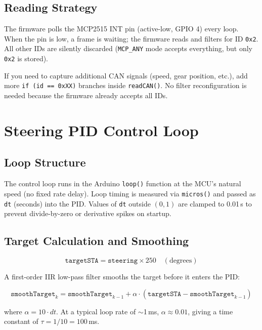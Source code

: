 \documentclass[12pt, letterpaper]{article}
\begin{document}
\subsection{Reading Strategy}

The firmware polls the MCP2515 INT pin (active-low, GPIO 4) every loop.
When the pin is low, a frame is waiting; the firmware reads and filters for
ID \texttt{0x2}.  All other IDs are silently discarded (\texttt{MCP\_ANY} mode
accepts everything, but only \texttt{0x2} is stored).

\begin{notebox}
If you need to capture additional CAN signals (speed, gear position, etc.),
add more \texttt{if (id == 0xXX)} branches inside \texttt{readCAN()}.  No
filter reconfiguration is needed because the firmware already accepts all IDs.
\end{notebox}

\section{Steering PID Control Loop}

\subsection{Loop Structure}

The control loop runs in the Arduino \texttt{loop()} function at the MCU's
natural speed (no fixed rate delay).  Loop timing is measured via
\texttt{micros()} and passed as \texttt{dt} (seconds) into the PID.  Values of
\texttt{dt} outside $(0, 1)$ are clamped to 0.01\,s to prevent divide-by-zero
or derivative spikes on startup.

\subsection{Target Calculation and Smoothing}

\[
  \texttt{targetSTA} = \texttt{steering} \times 250 \quad (\text{degrees})
\]

A first-order IIR low-pass filter smooths the target before it enters the PID:

\[
  \texttt{smoothTarget}_{k} = \texttt{smoothTarget}_{k-1}
    + \alpha \cdot (\texttt{targetSTA} - \texttt{smoothTarget}_{k-1})
\]

where $\alpha = 10 \cdot dt$.  At a typical loop rate of $\sim$1\,ms,
$\alpha \approx 0.01$, giving a time constant of $\tau = 1/10 = 100$\,ms.
\end{document}
